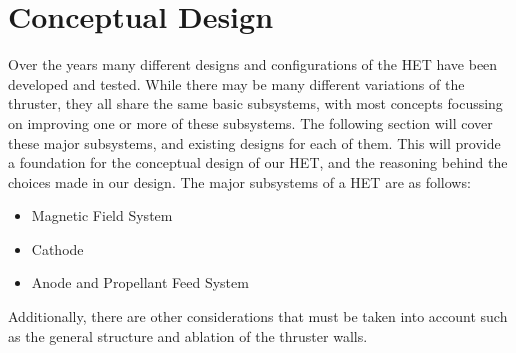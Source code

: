 \chapter{Conceptual Design}

Over the years many different designs and configurations of the \ac{HET} have been developed and tested. While there may be many different variations of the thruster, they all share the same basic subsystems, with most concepts focussing on improving one or more of these subsystems. The following section will cover these major subsystems, and existing designs for each of them. This will provide a foundation for the conceptual design of our \ac{HET}, and the reasoning behind the choices made in our design. The major subsystems of a \ac{HET} are as follows:

\begin{itemize}
    \item Magnetic Field System
    \item Cathode
    \item Anode and Propellant Feed System
\end{itemize}

Additionally, there are other considerations that must be taken into account such as the general structure and ablation of the thruster walls.




